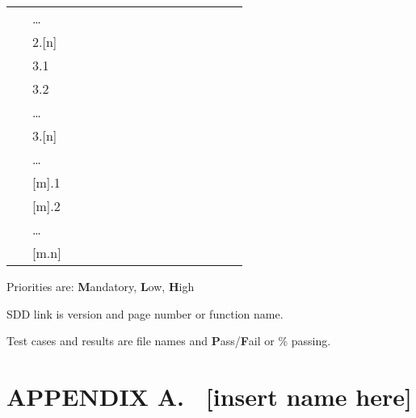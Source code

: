 \documentclass[twoside,letterpaper]{article}
\begin{document}
\begin{flushleft}
\begin{supertabular}{m{0.9212598in}|m{0.42125985in}|m{1.9212599in}|m{0.39275986in}|m{0.7587598in}|m{0.6622598in}|m{0.5462598in}|m{0.6712598in}|m{0.6087598in}|m{0.6712598in}|m{0.6295598in}|}
 &
\centering {}\color{black} {\dots} &
~
 &
~
 &
~
 &
~
 &
~
 &
~
 &
~
 &
~
 &
~
\\\hhline{~----------}
 &
\centering {}\color{black} 2.[n] &
~
 &
~
 &
~
 &
~
 &
~
 &
~
 &
~
 &
~
 &
~
\\\hhline{~----------}
 &
\centering {}\color{black} 3.1 &
~
 &
~
 &
~
 &
~
 &
~
 &
~
 &
~
 &
~
 &
~
\\\hline
 &
\centering {}\color{black} 3.2 &
~
 &
~
 &
~
 &
~
 &
~
 &
~
 &
~
 &
~
 &
~
\\\hhline{~----------}
 &
\centering {}\color{black} {\dots} &
~
 &
~
 &
~
 &
~
 &
~
 &
~
 &
~
 &
~
 &
~
\\\hhline{~----------}
 &
\centering {}\color{black} 3.[n] &
~
 &
~
 &
~
 &
~
 &
~
 &
~
 &
~
 &
~
 &
~
\\\hhline{~----------}
 &
\centering {}\color{black} {\dots} &
~
 &
~
 &
~
 &
~
 &
~
 &
~
 &
~
 &
~
 &
~
\\\hline
{} &
\centering {}\color{black} [m].1 &
~
 &
~
 &
~
 &
~
 &
~
 &
~
 &
~
 &
~
 &
~
\\\hline
 &
\centering {}\color{black} [m].2 &
~
 &
~
 &
~
 &
~
 &
~
 &
~
 &
~
 &
~
 &
~
\\\hhline{~----------}
 &
\centering {}\color{black} {\dots} &
~
 &
~
 &
~
 &
~
 &
~
 &
~
 &
~
 &
~
 &
~
\\\hline
{} &
\centering {}\color{black} [m.n] &
~
 &
~
 &
~
 &
~
 &
~
 &
~
 &
~
 &
~
 &
~
\\\hline
\end{supertabular}
\end{flushleft}
{\color{black}
Priorities are: \textbf{M}andatory, \textbf{L}ow, \textbf{H}igh}

{\color{black}
SDD link is version and page number or function name.}

{\color{black}
Test cases and results are file names and \textbf{P}ass/\textbf{F}ail or
\% passing.}

\clearpage\pagestyle{Appendix}
\section[APPENDIX A. \ [insert name
here{]}]{\rmfamily\bfseries\color{black}
APPENDIX A. \ [insert name here]}
\end{document}

